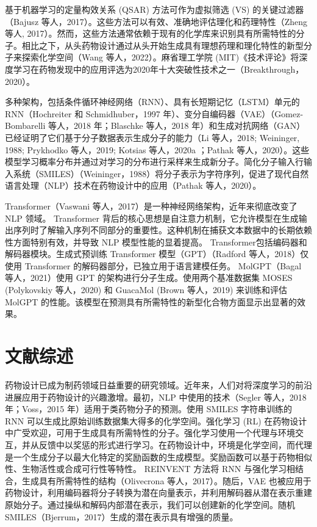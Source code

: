 基于机器学习的定量构效关系 (QSAR) 方法可作为虚拟筛选 (VS) 的关键过滤器（Bajusz 等人，2017）。这些方法可以有效、准确地评估理化和药理特性（Zheng 等人, 2017）。然而，这些方法通常依赖于现有的化学库来识别具有所需特性的分子。相比之下，从头药物设计通过从头开始生成具有理想药理和理化特性的新型分子来探索化学空间（Wang 等人，2022）。麻省理工学院 (MIT)《技术评论》将深度学习在药物发现中的应用评选为2020年十大突破性技术之一（Breakthrough，2020）。

多种架构，包括条件循环神经网络（RNN）、具有长短期记忆（LSTM）单元的 RNN（Hochreiter 和 Schmidhuber，1997 年）、变分自编码器（VAE）（Gomez-Bombarelli 等人，2018 年；Blaschke 等人，2018 年）和生成对抗网络（GAN）已经证明了它们基于分子数据表示生成分子的能力（Li 等人，2018; Weininger, 1988; Prykhodko 等人，2019; Kotsias 等人，2020a ；Pathak 等人，2020）。这些模型学习概率分布并通过对学习的分布进行采样来生成新分子。简化分子输入行输入系统（SMILES）（Weininger，1988）将分子表示为字符序列，促进了现代自然语言处理（NLP）技术在药物设计中的应用（Pathak 等人，2020）。

Transformer（Vaswani 等人，2017）是一种神经网络架构，近年来彻底改变了 NLP 领域。 Transformer 背后的核心思想是自注意力机制，它允许模型在生成输出序列时了解输入序列不同部分的重要性。这种机制在捕获文本数据中的长期依赖性方面特别有效，并导致 NLP 模型性能的显着提高。 Transformer包括编码器和解码器模块。生成式预训练 Transformer 模型（GPT）（Radford 等人，2018）仅使用 Transformer 的解码器部分，已独立用于语言建模任务。 MolGPT（Bagal 等人，2021）使用 GPT 的架构进行分子生成。使用两个基准数据集 MOSES (Polykovskiy 等人，2020) 和 GuacaMol (Brown 等人，2019) 来训练和评估 MolGPT 的性能。该模型在预测具有所需特性的新型化合物方面显示出显著的效果。

\section{文献综述}

药物设计已成为制药领域日益重要的研究领域。近年来，人们对将深度学习的前沿进展应用于药物设计的兴趣激增。最初，NLP 中使用的技术（Segler 等人，2018 年；Voss，2015 年）适用于类药物分子的预测。使用 SMILES 字符串训练的 RNN 可以生成比原始训练数据集大得多的化学空间。强化学习 (RL) 在药物设计中广受欢迎，可用于生成具有所需特性的分子。强化学习使用一个代理与环境交互，并从反馈中以奖惩的形式进行学习。在药物设计中，环境是化学空间，而代理是一个生成分子以最大化特定的奖励函数的生成模型。奖励函数可以基于药物相似性、生物活性或合成可行性等特性。 REINVENT 方法将 RNN 与强化学习相结合，生成具有所需特性的结构（Olivecrona 等人，2017）。随后，VAE 也被应用于药物设计，利用编码器将分子转换为潜在向量表示，并利用解码器从潜在表示重建原始分子。通过操纵和解码内部潜在表示，我们可以创建新的化学空间。随机 SMILES（Bjerrum，2017）生成的潜在表示具有增强的质量。

